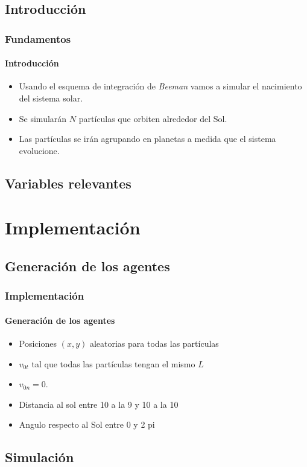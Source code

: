 \documentclass[hyperref={pdfpagelayout=SinglePage}]{beamer}
\begin{document}
\subsection{Introducción}

\begin{frame}
\frametitle{Fundamentos}
\framesubtitle{Introducción}
\begin{itemize}
	\item Usando el esquema de integración de \textit{Beeman} vamos a simular el nacimiento del sistema solar.
	\item Se simularán $N$ partículas que orbiten alrededor del Sol.
	\item Las partículas se irán agrupando en planetas a medida que el sistema evolucione.
\end{itemize}
\end{frame}

\subsection{Variables relevantes}

\section{Implementación}

\subsection{Generación de los agentes}

\begin{frame}
\frametitle{Implementación}
\framesubtitle{Generación de los agentes}
\begin{itemize}
	\item Posiciones $(x,y)$ aleatorias para todas las partículas
	\item $v_{0t}$ tal que todas las partículas tengan el mismo $L$
	\item $v_{0n} = 0$.
	\item Distancia al sol entre 10 a la 9 y 10 a la 10
	\item Angulo respecto al Sol entre 0 y 2 pi
\end{itemize}
\end{frame}

\subsection{Simulación}
\end{document}
